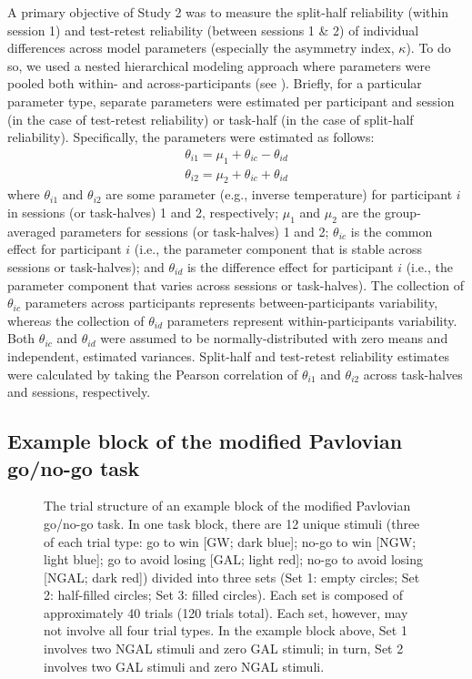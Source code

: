 \documentclass[a4paper,12pt]{article}
\begin{document}
\begin{refsection}[supp]
A primary objective of Study 2 was to measure the split-half reliability (within session 1) and test-retest reliability (between sessions 1 \& 2) of individual differences across model parameters (especially the asymmetry index, $\kappa$). To do so, we used a nested hierarchical modeling approach where parameters were pooled both within- and across-participants (see \cite{rouder2019psychometrics}). Briefly, for a particular parameter type, separate parameters were estimated per participant and session (in the case of test-retest reliability) or task-half (in the case of split-half reliability). Specifically, the parameters were estimated as follows:
\begin{equation}
\begin{split}
    \theta_{i1} = \mu_1 + \theta_{ic} - \theta_{id} \\
    \theta_{i2} = \mu_2 + \theta_{ic} + \theta_{id}
\end{split}
\end{equation}
where $\theta_{i1}$ and $\theta_{i2}$ are some parameter (e.g., inverse temperature) for participant $i$ in sessions (or task-halves) 1 and 2, respectively; $\mu_1$ and $\mu_2$ are the group-averaged parameters for sessions (or task-halves) 1 and 2; $\theta_{ic}$ is the common effect for participant $i$ (i.e., the parameter component that is stable across sessions or task-halves); and $\theta_{id}$ is the difference effect for participant $i$ (i.e., the parameter component that varies across sessions or task-halves). The collection of $\theta_{ic}$ parameters across participants represents between-participants variability, whereas the collection of $\theta_{id}$ parameters represent within-participants variability. Both $\theta_{ic}$ and $\theta_{id}$ were assumed to be normally-distributed with zero means and independent, estimated variances. Split-half and test-retest reliability estimates were calculated by taking the Pearson correlation of $\theta_{i1}$ and $\theta_{i2}$ across task-halves and sessions, respectively.

\break
\subsection*{Example block of the modified Pavlovian go/no-go task}

\begin{figure}[h]
    \centerline{}
    \caption{The trial structure of an example block of the modified Pavlovian go/no-go task. In one task block, there are 12 unique stimuli (three of each trial type: go to win [GW; dark blue]; no-go to win [NGW; light blue]; go to avoid losing [GAL; light red]; no-go to avoid losing [NGAL; dark red]) divided into three sets (Set 1: empty circles; Set 2: half-filled circles; Set 3: filled circles). Each set is composed of approximately 40 trials (120 trials total). Each set, however, may not involve all four trial types. In the example block above, Set 1 involves two NGAL stimuli and zero GAL stimuli; in turn, Set 2 involves two GAL stimuli and zero NGAL stimuli.}
    \label{fig:figS01}
\end{figure}


\end{refsection}
\end{document}
